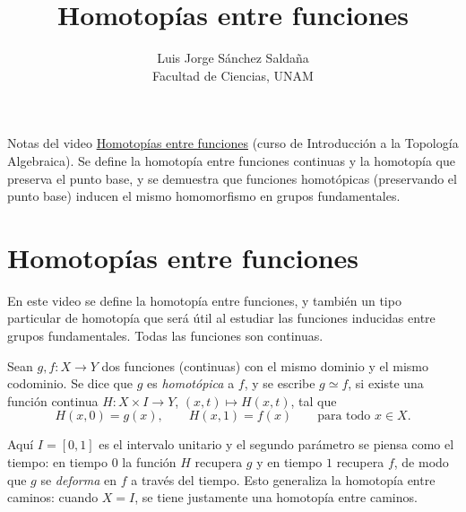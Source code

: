 \documentclass[11pt]{article}
\title{Homotopías entre funciones}
\author{Luis Jorge Sánchez Saldaña\\[2pt]\small Facultad de Ciencias, UNAM}
\date{}
\begin{document}
\maketitle

\noindent\small Notas del video
\href{https://www.youtube.com/watch?v=Ts7i-Am3nf8}{\guillemotleft{}Homotopías entre funciones\guillemotright{}}
(curso de Introducción a la Topología Algebraica). Se define la homotopía entre funciones continuas y la homotopía que preserva el punto base, y se demuestra que funciones homotópicas (preservando el punto base) inducen el mismo homomorfismo en grupos fundamentales.
\normalsize

\section*{Homotopías entre funciones}

En este video se define la homotopía entre funciones, y también un tipo particular de homotopía que será útil al estudiar las funciones inducidas entre grupos fundamentales. Todas las funciones son continuas.

\begin{defn}\label{def:homotopia-funciones}
Sean $g,f\colon X\to Y$ dos funciones (continuas) con el mismo dominio y el mismo codominio. Se dice que $g$ es \emph{homotópica} a $f$, y se escribe $g\simeq f$, si existe una función continua $H\colon X\times I\to Y$, $(x,t)\mapsto H(x,t)$, tal que
\[
  H(x,0)=g(x),\qquad H(x,1)=f(x)\qquad\text{para todo }x\in X.
\]
\end{defn}

Aquí $I=[0,1]$ es el intervalo unitario y el segundo parámetro se piensa como el tiempo: en tiempo $0$ la función $H$ recupera $g$ y en tiempo $1$ recupera $f$, de modo que $g$ se \emph{deforma} en $f$ a través del tiempo. Esto generaliza la homotopía entre caminos: cuando $X=I$, se tiene justamente una homotopía entre caminos.

\begin{center}
\end{center}
\end{document}
